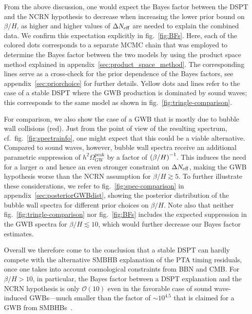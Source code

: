 From the above discussion, one would expect the Bayes factor between the \ac{DSPT} and the \ac{NCRN} hypothesis to decrease when increasing the lower prior bound on $\beta/H$, as higher and higher values of $\Delta N_\text{eff} $  are needed to explain the combined data. We confirm this expectation explicitly in fig.~\ref{fig:BFs}. Here, each of the colored dots  corresponds to a separate \ac{MCMC} chain that was employed to determine the Bayes factor between the two models by using the product space method explained in appendix~\ref{sec:product_space_method}. The corresponding lines serve as a cross-check for the prior dependence of the Bayes factors, see appendix~\ref{sec:priorchoice} for further details. Yellow dots and lines refer to the case of a stable \ac{DSPT} where the \ac{GWB} production is dominated by sound waves; this corresponds to the same model as shown in fig.~\ref{fig:tringle-comparison}.

For comparison, we also show the case of a \ac{GWB} that is mostly due to bubble wall collisions (red). Just from the point of view of the resulting spectrum, cf.~fig.~\ref{fig:spectrainfo}, one might expect that this could be a viable alternative.  Compared to sound waves,  however, bubble wall spectra receive an additional parametric suppression of $h^2\Omega_\text{GW}^\text{peak}$  by a factor of $\left( \beta/H \right)^{-1}$. This induces the need for a larger $\alpha$ and hence an even stronger constraint on $\Delta N_\text{eff} $, making the \ac{GWB} hypothesis worse than the \ac{NCRN} assumption for $\beta/H\gtrsim5$. To further illustrate these considerations, we refer to fig.~\ref{fig:spec-comparison} in appendix~\ref{sec:posteriorGWBdist}, showing the posterior distribution of the bubble wall spectra for different prior choices on  $\beta/H$. Note also that neither fig.~\ref{fig:tringle-comparison} nor fig.~\ref{fig:BFs} includes the expected suppression in the \ac{GWB} spectra for $\beta/H\lesssim10$, which would further decrease our Bayes factor estimates.

Overall we therefore come to the conclusion that a stable \ac{DSPT} can hardly compete with the alternative \ac{SMBHB} explanation of the \ac{PTA}  timing residuals, once one takes into account cosmological constraints from \ac{BBN} and \ac{CMB}. For $\beta/H>10$, in particular, the Bayes factor between a \ac{DSPT} explanation and the \ac{NCRN} hypothesis is only $\mathcal{O}(10)$ even in the favorable case of sound wave-induced \acp{GWB}---much smaller than the factor of $\sim10^{4.5}$ that is claimed for a \ac{GWB} from \acp{SMBHB}~\cite{NANOGrav:2020bcs}. 



